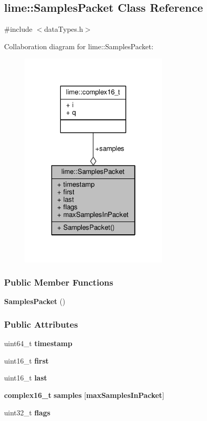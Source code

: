 \subsection{lime\+:\+:Samples\+Packet Class Reference}
\label{classlime_1_1SamplesPacket}


{\ttfamily \#include $<$data\+Types.\+h$>$}



Collaboration diagram for lime\+:\+:Samples\+Packet\+:
\nopagebreak
\begin{figure}[H]
\begin{center}
\leavevmode
\includegraphics[width=202pt]{d3/dbc/classlime_1_1SamplesPacket__coll__graph}
\end{center}
\end{figure}
\subsubsection*{Public Member Functions}
\begin{DoxyCompactItemize}
\item 
{\bf Samples\+Packet} ()
\end{DoxyCompactItemize}
\subsubsection*{Public Attributes}
\begin{DoxyCompactItemize}
\item 
uint64\+\_\+t {\bf timestamp}
\item 
uint16\+\_\+t {\bf first}
\item 
uint16\+\_\+t {\bf last}
\item 
{\bf complex16\+\_\+t} {\bf samples} [{\bf max\+Samples\+In\+Packet}]
\item 
uint32\+\_\+t {\bf flags}
\end{DoxyCompactItemize}

